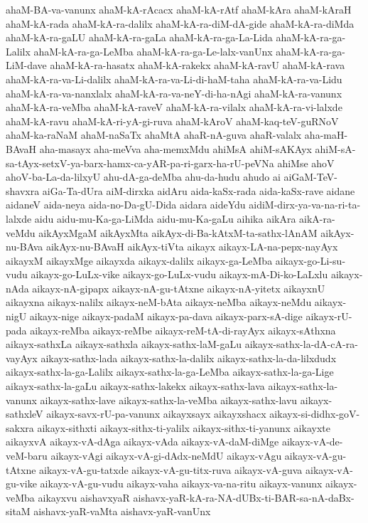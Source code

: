 {ahaM-BA-va-vanunx
ahaM-kA-rAcacx
ahaM-kA-rAtf
ahaM-kAra
ahaM-kAraH
ahaM-kA-rada
ahaM-kA-ra-dalilx
ahaM-kA-ra-diM-dA-gide
ahaM-kA-ra-diMda
ahaM-kA-ra-gaLU
ahaM-kA-ra-gaLa
ahaM-kA-ra-ga-La-Lida
ahaM-kA-ra-ga-Lalilx
ahaM-kA-ra-ga-LeMba
ahaM-kA-ra-ga-Le-lalx-vanUnx
ahaM-kA-ra-ga-LiM-dave
ahaM-kA-ra-hasatx
ahaM-kA-rakekx
ahaM-kA-ravU
ahaM-kA-rava
ahaM-kA-ra-va-Li-dalilx
ahaM-kA-ra-va-Li-di-haM-taha
ahaM-kA-ra-va-Lidu
ahaM-kA-ra-va-nanxlalx
ahaM-kA-ra-va-neY-di-ha-nAgi
ahaM-kA-ra-vanunx
ahaM-kA-ra-veMba
ahaM-kA-raveV
ahaM-kA-ra-vilalx
ahaM-kA-ra-vi-lalxde
ahaM-kA-ravu
ahaM-kA-ri-yA-gi-ruva
ahaM-kAroV
ahaM-kaq-teV-guRNoV
ahaM-ka-raNaM
ahaM-naSaTx
ahaMtA
ahaR-nA-guva
ahaR-valalx
aha-maH-BAvaH
aha-masayx
aha-meVva
aha-memxMdu
ahiMsA
ahiM-sAKAyx
ahiM-sA-sa-tAyx-setxV-ya-barx-hamx-ca-yAR-pa-ri-garx-ha-rU-peVNa
ahiMse
ahoV
ahoV-ba-La-da-lilxyU
ahu-dA-ga-deMba
ahu-da-hudu
ahudo
ai
aiGaM-TeV-shavxra
aiGa-Ta-dUra
aiM-dirxka
aidAru
aida-kaSx-rada
aida-kaSx-rave
aidane
aidaneV
aida-neya
aida-no-Da-gU-Dida
aidara
aideYdu
aidiM-dirx-ya-va-na-ri-ta-lalxde
aidu
aidu-mu-Ka-ga-LiMda
aidu-mu-Ka-gaLu
aihika
aikAra
aikA-ra-veMdu
aikAyxMgaM
aikAyxMta
aikAyx-di-Ba-kAtxM-ta-sathx-lAnAM
aikAyx-nu-BAva
aikAyx-nu-BAvaH
aikAyx-tiVta
aikayx
aikayx-LA-na-pepx-nayAyx
aikayxM
aikayxMge
aikayxda
aikayx-dalilx
aikayx-ga-LeMba
aikayx-go-Li-su-vudu
aikayx-go-LuLx-vike
aikayx-go-LuLx-vudu
aikayx-mA-Di-ko-LaLxlu
aikayx-nAda
aikayx-nA-gipapx
aikayx-nA-gu-tAtxne
aikayx-nA-yitetx
aikayxnU
aikayxna
aikayx-nalilx
aikayx-neM-bAta
aikayx-neMba
aikayx-neMdu
aikayx-nigU
aikayx-nige
aikayx-padaM
aikayx-pa-dava
aikayx-parx-sA-dige
aikayx-rU-pada
aikayx-reMba
aikayx-reMbe
aikayx-reM-tA-di-rayAyx
aikayx-sAthxna
aikayx-sathxLa
aikayx-sathxla
aikayx-sathx-laM-gaLu
aikayx-sathx-la-dA-cA-ra-vayAyx
aikayx-sathx-lada
aikayx-sathx-la-dalilx
aikayx-sathx-la-da-lilxdudx
aikayx-sathx-la-ga-Lalilx
aikayx-sathx-la-ga-LeMba
aikayx-sathx-la-ga-Lige
aikayx-sathx-la-gaLu
aikayx-sathx-lakekx
aikayx-sathx-lava
aikayx-sathx-la-vanunx
aikayx-sathx-lave
aikayx-sathx-la-veMba
aikayx-sathx-lavu
aikayx-sathxleV
aikayx-savx-rU-pa-vanunx
aikayxsayx
aikayxshacx
aikayx-si-didhx-goV-sakxra
aikayx-sithxti
aikayx-sithx-ti-yalilx
aikayx-sithx-ti-yanunx
aikayxte
aikayxvA
aikayx-vA-dAga
aikayx-vAda
aikayx-vA-daM-diMge
aikayx-vA-de-veM-baru
aikayx-vAgi
aikayx-vA-gi-dAdx-neMdU
aikayx-vAgu
aikayx-vA-gu-tAtxne
aikayx-vA-gu-tatxde
aikayx-vA-gu-titx-ruva
aikayx-vA-guva
aikayx-vA-gu-vike
aikayx-vA-gu-vudu
aikayx-vaha
aikayx-va-na-ritu
aikayx-vanunx
aikayx-veMba
aikayxvu
aishavxyaR
aishavx-yaR-kA-ra-NA-dUBx-ti-BAR-sa-nA-daBx-sitaM
aishavx-yaR-vaMta
aishavx-yaR-vanUnx
}
